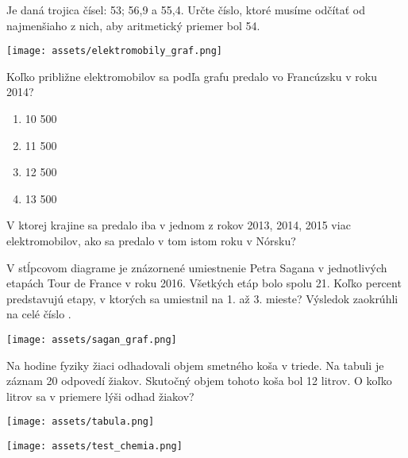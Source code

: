 \begin{example}
	Je daná trojica čísel: 53; 56,9 a 55,4. Určte číslo, ktoré musíme odčítať od najmenšiaho z nich, aby aritmetický priemer bol 54.
\end{example}

\begin{center}
	\texttt{[image: assets/elektromobily\_graf.png]}
\end{center}

\begin{example}
	Koľko približne elektromobilov sa podľa grafu predalo vo Francúzsku v roku 2014?
	
	\begin{enumerate}
		\item 10 500
		\item 11 500
		\item 12 500
		\item 13 500
	\end{enumerate}
\end{example}

\begin{example}
	V ktorej krajine sa predalo iba v jednom z rokov 2013, 2014, 2015 viac elektromobilov, ako sa predalo v tom istom roku v Nórsku?
\end{example}

\begin{example}
	V stĺpcovom diagrame je znázornené umiestnenie Petra Sagana v jednotlivých etapách Tour de France v roku 2016. Všetkých etáp bolo spolu 21. Koľko percent predstavujú etapy, v ktorých sa umiestnil na 1. až 3. mieste? Výsledok zaokrúhli na celé číslo . 
	
	\begin{center}
		\texttt{[image: assets/sagan\_graf.png]}
	\end{center}
\end{example}

\begin{example}
	Na hodine fyziky žiaci odhadovali objem smetného koša v triede. Na tabuli je záznam 20 odpovedí žiakov. Skutočný objem tohoto koša bol 12 litrov. O koľko litrov sa v priemere lýši odhad žiakov? 
	
	\begin{center}
		\texttt{[image: assets/tabula.png]}
	\end{center}
\end{example}

\begin{center}
	\texttt{[image: assets/test\_chemia.png]}
\end{center}

